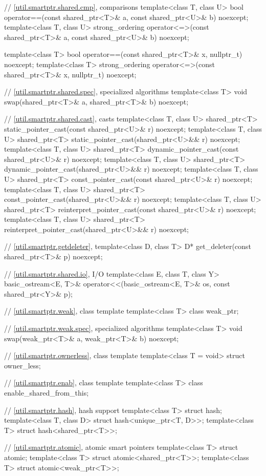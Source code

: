 \begin{codeblock}
{  // \ref{util.smartptr.shared.cmp},  comparisons
  template<class T, class U>
    bool operator==(const shared_ptr<T>& a, const shared_ptr<U>& b) noexcept;
  template<class T, class U>
    strong_ordering operator<=>(const shared_ptr<T>& a, const shared_ptr<U>& b) noexcept;

  template<class T>
    bool operator==(const shared_ptr<T>& x, nullptr_t) noexcept;
  template<class T>
    strong_ordering operator<=>(const shared_ptr<T>& x, nullptr_t) noexcept;

  // \ref{util.smartptr.shared.spec},  specialized algorithms
  template<class T>
    void swap(shared_ptr<T>& a, shared_ptr<T>& b) noexcept;

  // \ref{util.smartptr.shared.cast},  casts
  template<class T, class U>
    shared_ptr<T> static_pointer_cast(const shared_ptr<U>& r) noexcept;
  template<class T, class U>
    shared_ptr<T> static_pointer_cast(shared_ptr<U>&& r) noexcept;
  template<class T, class U>
    shared_ptr<T> dynamic_pointer_cast(const shared_ptr<U>& r) noexcept;
  template<class T, class U>
    shared_ptr<T> dynamic_pointer_cast(shared_ptr<U>&& r) noexcept;
  template<class T, class U>
    shared_ptr<T> const_pointer_cast(const shared_ptr<U>& r) noexcept;
  template<class T, class U>
    shared_ptr<T> const_pointer_cast(shared_ptr<U>&& r) noexcept;
  template<class T, class U>
    shared_ptr<T> reinterpret_pointer_cast(const shared_ptr<U>& r) noexcept;
  template<class T, class U>
    shared_ptr<T> reinterpret_pointer_cast(shared_ptr<U>&& r) noexcept;

  // \ref{util.smartptr.getdeleter},  
  template<class D, class T>
    D* get_deleter(const shared_ptr<T>& p) noexcept;

  // \ref{util.smartptr.shared.io},  I/O
  template<class E, class T, class Y>
    basic_ostream<E, T>& operator<<(basic_ostream<E, T>& os, const shared_ptr<Y>& p);

  // \ref{util.smartptr.weak}, class template 
  template<class T> class weak_ptr;

  // \ref{util.smartptr.weak.spec},  specialized algorithms
  template<class T> void swap(weak_ptr<T>& a, weak_ptr<T>& b) noexcept;

  // \ref{util.smartptr.ownerless}, class template 
  template<class T = void> struct owner_less;

  // \ref{util.smartptr.enab}, class template 
  template<class T> class enable_shared_from_this;

  // \ref{util.smartptr.hash}, hash support
  template<class T> struct hash;
  template<class T, class D> struct hash<unique_ptr<T, D>>;
  template<class T> struct hash<shared_ptr<T>>;

  // \ref{util.smartptr.atomic}, atomic smart pointers
  template<class T> struct atomic;
  template<class T> struct atomic<shared_ptr<T>>;
  template<class T> struct atomic<weak_ptr<T>>;
}
\end{codeblock}

